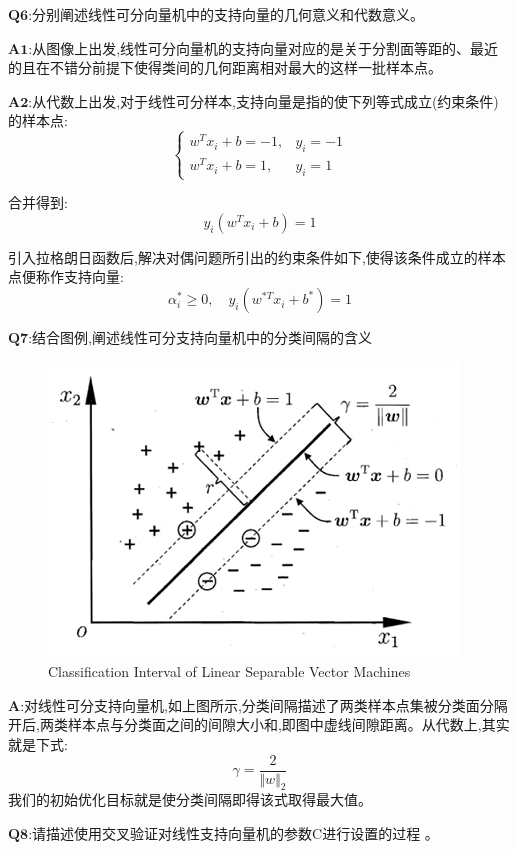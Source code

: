 \documentclass[homework]{IEEEtran}
\begin{document}
\begin{CJK}{UTF8}{gkai}
$\mathbf{Q6}$:分别阐述线性可分向量机中的支持向量的几何意义和代数意义。\par
$\mathbf{A1}$:从图像上出发,线性可分向量机的支持向量对应的是关于分割面等距的、最近的且在不错分前提下使得类间的几何距离相对最大的这样一批样本点。\par
$\mathbf{A2}$:从代数上出发,对于线性可分样本,支持向量是指的使下列等式成立(约束条件)的样本点:
\begin{equation*}
    \begin{cases}
        w^Tx_i+b=-1, &y_i=-1 \\
        w^Tx_i+b=1,&y_i=1 
    \end{cases}
\end{equation*}\par
合并得到:
$$
y_i\left(w^Tx_i+b \right) = 1
$$\par
引入拉格朗日函数后,解决对偶问题所引出的约束条件如下,使得该条件成立的样本点便称作支持向量:
$$
\alpha_{i}^{*} \geq 0,\quad y_i\left(w^{*T}x_i+b^{*} \right) = 1
$$\par
$\mathbf{Q7}$:结合图例,阐述线性可分支持向量机中的分类间隔的含义 \par
\begin{figure}[htb]
    \centerline{\includegraphics{Images/fig3.png}}
    \caption{Classification Interval of Linear Separable Vector Machines}
    \label{fig3}
    \end{figure}
$\mathbf{A}$:对线性可分支持向量机,如上图所示,分类间隔描述了两类样本点集被分类面分隔开后,两类样本点与分类面之间的间隙大小和,即图中虚线间隙距离。从代数上,其实就是下式:
$$
\gamma = \frac{2}{\Vert w \Vert_{2}}
$$
我们的初始优化目标就是使分类间隔即得该式取得最大值。\par
$\mathbf{Q8}$:请描述使用交叉验证对线性支持向量机的参数C进行设置的过程	。	\par

\end{CJK}
\end{document}
